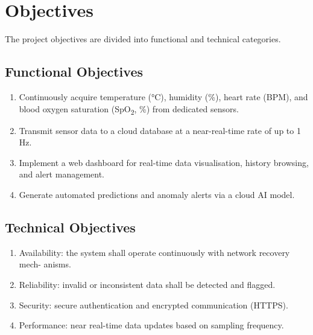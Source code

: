 \section{Objectives}

The project objectives are divided into functional and technical categories.

\subsection*{Functional Objectives}

\begin{enumerate}
	\item Continuously acquire temperature (°C), humidity (\%), heart rate (BPM), and
	      blood oxygen saturation (SpO\textsubscript{2}, \%) from dedicated sensors.
	\item Transmit sensor data to a cloud database at a near-real-time rate of up to 1\,Hz.
	\item Implement a web dashboard for real-time data visualisation, history browsing,
	      and alert management.
	\item Generate automated predictions and anomaly alerts via a cloud AI model.
\end{enumerate}

\subsection*{Technical Objectives}

\begin{enumerate}
	\item Availability: the system shall operate continuously with network recovery mech-
	      anisms.
	\item Reliability: invalid or inconsistent data shall be detected and flagged.
	\item Security: secure authentication and encrypted communication (HTTPS).
	\item Performance: near real-time data updates based on sampling frequency.
\end{enumerate}
